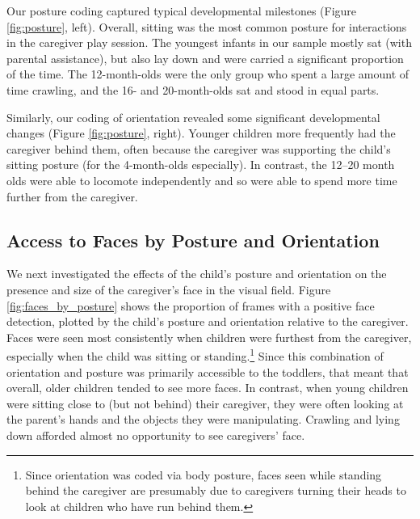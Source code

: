 \documentclass[10pt,letterpaper]{article}
\begin{document}
Our posture coding captured typical developmental milestones (Figure \ref{fig:posture}, left). Overall, sitting was the most common posture for interactions in the caregiver play session. The youngest infants in our sample mostly sat (with parental assistance), but also lay down and were carried a significant proportion of the time. The 12-month-olds were the only group who spent a large amount of time crawling, and the 16- and 20-month-olds sat and stood in equal parts. 



Similarly, our coding of orientation revealed some significant developmental changes (Figure \ref{fig:posture}, right). Younger children more frequently had the caregiver behind them, often because the caregiver was supporting the child's sitting posture (for the 4-month-olds especially). In contrast, the 12--20 month olds were able to locomote independently and so were able to spend more time further from the caregiver. 


\subsection{Access to Faces by Posture and Orientation}


We next investigated the effects of the child's posture and orientation on the presence and size of the caregiver's face in the visual field. Figure \ref{fig:faces_by_posture} shows the proportion of frames with a positive face detection, plotted by the child's posture and orientation relative to the caregiver. Faces were seen most consistently when children were furthest from the caregiver, especially when the child was sitting or standing.\footnote{Since orientation was coded via body posture, faces seen while standing behind the caregiver are presumably due to caregivers turning their heads to look at children who have run behind them.} Since this combination of orientation and posture was primarily accessible to the toddlers, that meant that overall, older children tended to see more faces. In contrast, when young children were sitting close to (but not behind) their caregiver, they were often looking at the parent's hands and the objects they were manipulating. Crawling and lying down afforded almost no opportunity to see caregivers' face. 
\end{document}

